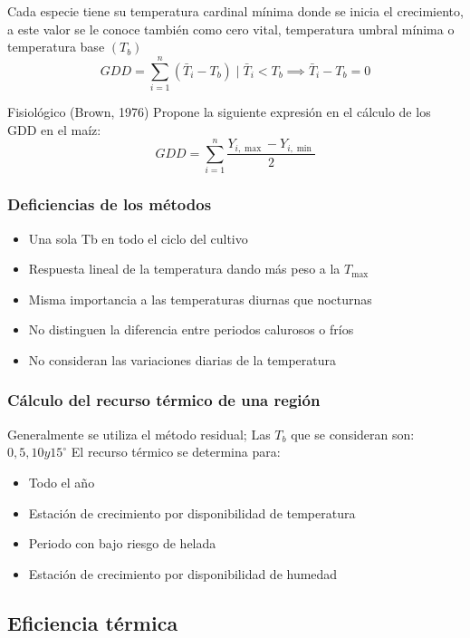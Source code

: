 Cada especie tiene su temperatura cardinal mínima donde se inicia el crecimiento, a este valor se le conoce también como cero vital, temperatura umbral mínima o temperatura base $(T_b)$
\begin{equation}
    GDD= \sum_{i=1}^n \left(\bar{T}_i-T_b\right) \mid \bar{T}_i <T_b\implies  \bar{T}_i-T_b =0
\end{equation}

Fisiológico (Brown, 1976) Propone la siguiente expresión en el cálculo de los GDD en el maíz:
\begin{equation}
    GDD= \sum_{i=1}^n\frac{Y_{i,\max }-Y_{i,\min}}{2}
\end{equation}

\subsubsection{Deficiencias de los métodos}
\begin{itemize}
    \item Una sola Tb en todo el ciclo del cultivo
    \item Respuesta lineal de la temperatura dando más peso a la $T_{\max}$
    \item Misma importancia a las temperaturas diurnas que nocturnas
    \item No distinguen la diferencia entre periodos calurosos o fríos
    \item No consideran las variaciones diarias de la temperatura
\end{itemize}
\subsubsection{Cálculo del recurso térmico de una región}

Generalmente se utiliza el método residual; Las $T_b$ que se consideran son: $0, 5, 10 y 15 ^{\circ}$
El recurso térmico se determina para:
\begin{itemize}
\item Todo el año
\item Estación de crecimiento por disponibilidad de temperatura
\item Periodo con bajo riesgo de helada
\item Estación de crecimiento por disponibilidad de humedad
\end{itemize}
\subsection{Eficiencia térmica}

